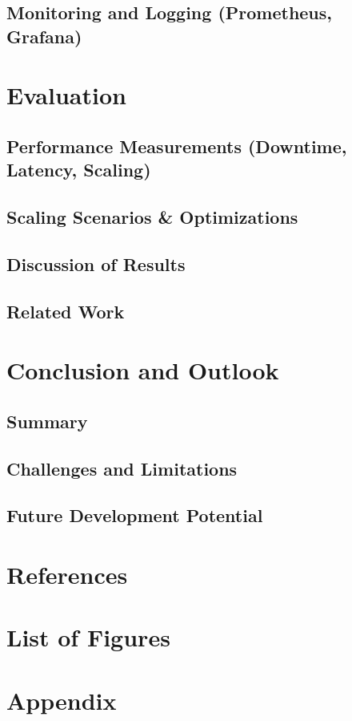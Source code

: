 \documentclass[11pt, a4paper, oneside]{scrartcl}
\begin{document}
        \subsection{Monitoring and Logging (Prometheus, Grafana)}

    \section{Evaluation}

        \subsection{Performance Measurements (Downtime, Latency, Scaling)}

        \subsection{Scaling Scenarios \& Optimizations}

        \subsection{Discussion of Results}

        \subsection{Related Work}

    \section{Conclusion and Outlook}

        \subsection{Summary}

        \subsection{Challenges and Limitations}

        \subsection{Future Development Potential}

    \section*{References}
        \printbibliography[heading=none]

    \section*{List of Figures}
        \begingroup
            \renewcommand{\listfigurename}{} %
            \listoffigures
        \endgroup

    \section*{Appendix}
\end{document}
